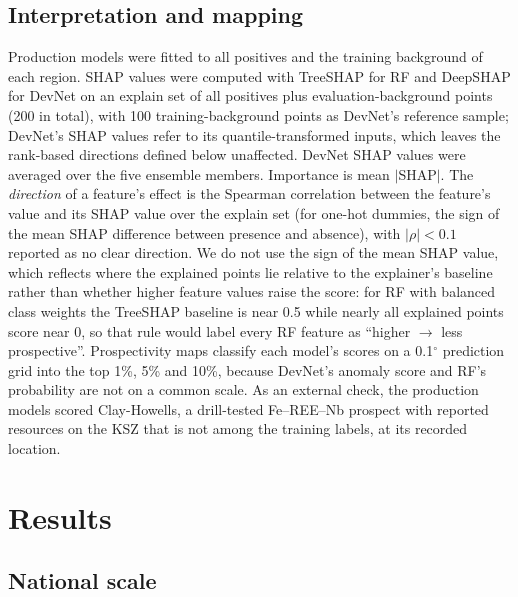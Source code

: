 \documentclass[pdflatex,sn-apa]{sn-jnl}
\begin{document}
\subsection{Interpretation and mapping}\label{sec:shap}

Production models were fitted to all positives and the training background of each region. SHAP values \citep{Lundberg2017} were computed with TreeSHAP for RF \citep{Lundberg2020} and DeepSHAP for DevNet on an explain set of all positives plus evaluation-background points (200 in total), with 100 training-background points as DevNet's reference sample; DevNet's SHAP values refer to its quantile-transformed inputs, which leaves the rank-based directions defined below unaffected. DevNet SHAP values were averaged over the five ensemble members. Importance is mean $|$SHAP$|$. The \emph{direction} of a feature's effect is the Spearman correlation between the feature's value and its SHAP value over the explain set (for one-hot dummies, the sign of the mean SHAP difference between presence and absence), with $|\rho| < 0.1$ reported as no clear direction. We do not use the sign of the mean SHAP value, which reflects where the explained points lie relative to the explainer's baseline rather than whether higher feature values raise the score: for RF with balanced class weights the TreeSHAP baseline is near 0.5 while nearly all explained points score near 0, so that rule would label every RF feature as ``higher $\rightarrow$ less prospective''. Prospectivity maps classify each model's scores on a 0.1$^\circ$ prediction grid into the top 1\%, 5\% and 10\%, because DevNet's anomaly score and RF's probability are not on a common scale. As an external check, the production models scored Clay-Howells, a drill-tested Fe--REE--Nb prospect with reported resources on the KSZ \citep{OGS2011} that is not among the training labels, at its recorded location.

\section{Results}\label{sec:results}

\subsection{National scale}\label{sec:res-national}\label{sec:res-ladder}
\end{document}
